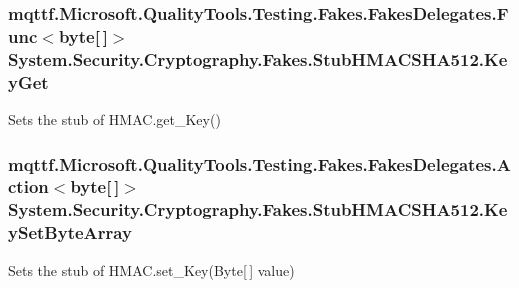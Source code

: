 \hypertarget{class_system_1_1_security_1_1_cryptography_1_1_fakes_1_1_stub_h_m_a_c_s_h_a512_ac3c35f35097c340c745323319825d17d}{
\subsubsection[{Key\-Get}]{\setlength{\rightskip}{0pt plus 5cm}mqttf.\-Microsoft.\-Quality\-Tools.\-Testing.\-Fakes.\-Fakes\-Delegates.\-Func$<$byte\mbox{[}$\,$\mbox{]}$>$ System.\-Security.\-Cryptography.\-Fakes.\-Stub\-H\-M\-A\-C\-S\-H\-A512.\-Key\-Get}}\label{class_system_1_1_security_1_1_cryptography_1_1_fakes_1_1_stub_h_m_a_c_s_h_a512_ac3c35f35097c340c745323319825d17d}


Sets the stub of H\-M\-A\-C.\-get\-\_\-\-Key()

\hypertarget{class_system_1_1_security_1_1_cryptography_1_1_fakes_1_1_stub_h_m_a_c_s_h_a512_a65554b6852bd0ba7d52c843cb66acfcb}{
\subsubsection[{Key\-Set\-Byte\-Array}]{\setlength{\rightskip}{0pt plus 5cm}mqttf.\-Microsoft.\-Quality\-Tools.\-Testing.\-Fakes.\-Fakes\-Delegates.\-Action$<$byte\mbox{[}$\,$\mbox{]}$>$ System.\-Security.\-Cryptography.\-Fakes.\-Stub\-H\-M\-A\-C\-S\-H\-A512.\-Key\-Set\-Byte\-Array}}\label{class_system_1_1_security_1_1_cryptography_1_1_fakes_1_1_stub_h_m_a_c_s_h_a512_a65554b6852bd0ba7d52c843cb66acfcb}


Sets the stub of H\-M\-A\-C.\-set\-\_\-\-Key(\-Byte\mbox{[}$\,$\mbox{]} value)

